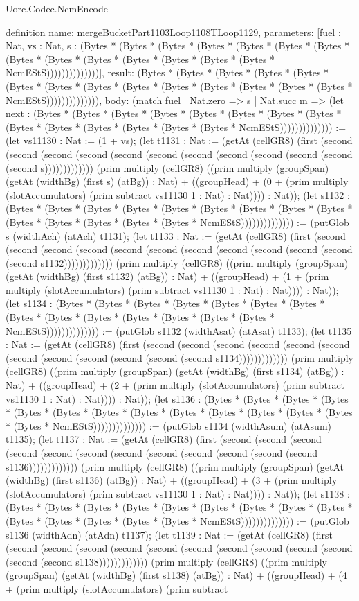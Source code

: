\begin{lexlean}{Uorc.Codec.NcmEncode}
\begin{semanticmodule}
definition{
  name: mergeBucketPart1103Loop1108TLoop1129,
  parameters: [fuel : Nat, vs : Nat, s : (Bytes * (Bytes * (Bytes * (Bytes * (Bytes * (Bytes * (Bytes * (Bytes * (Bytes * (Bytes * (Bytes * (Bytes * (Bytes * (Bytes * NcmEStS))))))))))))))],
  result: (Bytes * (Bytes * (Bytes * (Bytes * (Bytes * (Bytes * (Bytes * (Bytes * (Bytes * (Bytes * (Bytes * (Bytes * (Bytes * (Bytes * NcmEStS)))))))))))))),
  body: (match fuel
    | Nat.zero => s
    | Nat.succ m => (let next : (Bytes * (Bytes * (Bytes * (Bytes * (Bytes * (Bytes * (Bytes * (Bytes * (Bytes * (Bytes * (Bytes * (Bytes * (Bytes * (Bytes * NcmEStS)))))))))))))) := (let vs11130 : Nat := (1 + vs); (let t1131 : Nat := (getAt (cellGR8) (first (second (second (second (second (second (second (second (second (second (second (second (second s))))))))))))) (prim multiply (cellGR8) ((prim multiply (groupSpan) (getAt (widthBg) (first s) (atBg)) : Nat) + ((groupHead) + (0 + (prim multiply (slotAccumulators) (prim subtract vs11130 1 : Nat) : Nat)))) : Nat)); (let s1132 : (Bytes * (Bytes * (Bytes * (Bytes * (Bytes * (Bytes * (Bytes * (Bytes * (Bytes * (Bytes * (Bytes * (Bytes * (Bytes * (Bytes * NcmEStS)))))))))))))) := (putGlob s (widthAch) (atAch) t1131); (let t1133 : Nat := (getAt (cellGR8) (first (second (second (second (second (second (second (second (second (second (second (second (second s1132))))))))))))) (prim multiply (cellGR8) ((prim multiply (groupSpan) (getAt (widthBg) (first s1132) (atBg)) : Nat) + ((groupHead) + (1 + (prim multiply (slotAccumulators) (prim subtract vs11130 1 : Nat) : Nat)))) : Nat)); (let s1134 : (Bytes * (Bytes * (Bytes * (Bytes * (Bytes * (Bytes * (Bytes * (Bytes * (Bytes * (Bytes * (Bytes * (Bytes * (Bytes * (Bytes * NcmEStS)))))))))))))) := (putGlob s1132 (widthAsat) (atAsat) t1133); (let t1135 : Nat := (getAt (cellGR8) (first (second (second (second (second (second (second (second (second (second (second (second (second s1134))))))))))))) (prim multiply (cellGR8) ((prim multiply (groupSpan) (getAt (widthBg) (first s1134) (atBg)) : Nat) + ((groupHead) + (2 + (prim multiply (slotAccumulators) (prim subtract vs11130 1 : Nat) : Nat)))) : Nat)); (let s1136 : (Bytes * (Bytes * (Bytes * (Bytes * (Bytes * (Bytes * (Bytes * (Bytes * (Bytes * (Bytes * (Bytes * (Bytes * (Bytes * (Bytes * NcmEStS)))))))))))))) := (putGlob s1134 (widthAsum) (atAsum) t1135); (let t1137 : Nat := (getAt (cellGR8) (first (second (second (second (second (second (second (second (second (second (second (second (second s1136))))))))))))) (prim multiply (cellGR8) ((prim multiply (groupSpan) (getAt (widthBg) (first s1136) (atBg)) : Nat) + ((groupHead) + (3 + (prim multiply (slotAccumulators) (prim subtract vs11130 1 : Nat) : Nat)))) : Nat)); (let s1138 : (Bytes * (Bytes * (Bytes * (Bytes * (Bytes * (Bytes * (Bytes * (Bytes * (Bytes * (Bytes * (Bytes * (Bytes * (Bytes * (Bytes * NcmEStS)))))))))))))) := (putGlob s1136 (widthAdn) (atAdn) t1137); (let t1139 : Nat := (getAt (cellGR8) (first (second (second (second (second (second (second (second (second (second (second (second (second s1138))))))))))))) (prim multiply (cellGR8) ((prim multiply (groupSpan) (getAt (widthBg) (first s1138) (atBg)) : Nat) + ((groupHead) + (4 + (prim multiply (slotAccumulators) (prim subtract }
\end{semanticmodule}
\end{lexlean}

